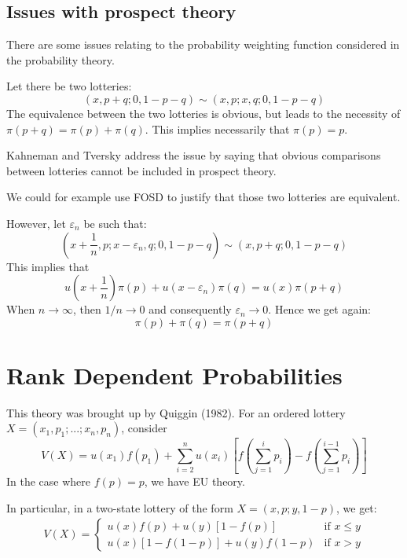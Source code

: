 \documentclass[12pt]{report}
\begin{document}
\subsection{Issues with prospect theory}

There are some issues relating to the probability weighting function considered in the probability theory.

Let there be two lotteries:$$(x, p+q; 0, 1-p-q) \sim (x,p;x,q;0,1-p-q)$$ The equivalence between the two lotteries is obvious, but leads to the necessity of $\pi(p+q) = \pi(p) + \pi(q)$. This implies necessarily that $\pi(p) = p$.

Kahneman and Tversky address the issue by saying that obvious comparisons between lotteries cannot be included in prospect theory.

We could for example use FOSD to justify that those two lotteries are equivalent.

However, let $\varepsilon_n$ be such that:$$(x + \frac{1}{n}, p; x-\varepsilon_n, q; 0, 1-p-q) \sim (x, p+q; 0, 1-p-q)$$ This implies that $$u(x+\frac{1}{n})\pi(p) + u(x-\varepsilon_n)\pi(q) = u(x)\pi(p+q) $$ When $n\to\infty$, then $1/n\to 0$ and consequently $\varepsilon_n\to 0$. Hence we get again:$$\pi(p)+\pi(q) = \pi(p+q)$$

\section{Rank Dependent Probabilities}

This theory was brought up by Quiggin (1982). For an ordered lottery $X = (x_1, p_1; ...;x_n, p_n)$, consider$$V(X) = u(x_1)f(p_1) + \sum_{i=2}^{n}u(x_i)\left[f\left(\sum_{j=1}^{i}p_i \right)-f\left(\sum_{j=1}^{i-1}p_i\right)\right] $$ In the case where $f(p) = p$, we have EU theory.

In particular, in a two-state lottery of the form $X=(x,p;y,1-p)$, we get:\begin{align*}
V(X) = \begin{cases}
u(x)f(p) + u(y)[1 - f(p)] & \text{if } x\leq y \\
u(x)[1-f(1-p)] + u(y)f(1-p) & \text{if } x > y
\end{cases}
\end{align*}
\end{document}
